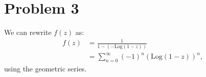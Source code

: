 \documentclass[letterpaper, titlepage, DIV=14]{scrartcl}
\newcommand{\Log}{\text{Log}}
\begin{document}
    

    \section*{Problem 3}
    We can rewrite $f(z)$ as:
    \begin{align*}
      f(z) &= \frac{1}{1-(-\Log(1-z))} \\
          &= \sum_{n=0}^{\infty}(-1)^{n}(\Log(1-z))^{n},
    \end{align*} using the geometric series.
    
\end{document}
